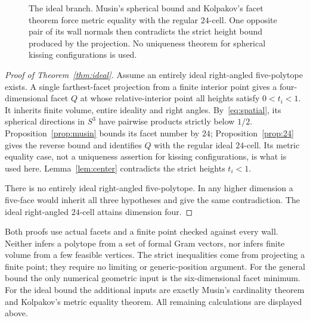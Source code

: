 \documentclass[11pt]{article}
\theoremstyle{remark}
\newcommand{\CELL}{\mathcal C}
\begin{document}
\begin{figure}[t]
\centering
{}
\caption{The ideal branch. Musin's spherical bound and Kolpakov's
facet theorem force metric equality with the regular $24$-cell.
One opposite pair of its wall normals then contradicts the strict
height bound produced by the projection. No uniqueness theorem for
spherical kissing configurations is used.}
\label{fig:idealbranch}
\end{figure}

\begin{proof}[Proof of Theorem~\ref{thm:ideal}]
Assume an entirely ideal right-angled five-polytope exists. A single
farthest-facet projection from a finite interior point gives a
four-dimensional facet $Q$ at whose relative-interior point all heights satisfy
$0<t_i<1$. It inherits finite volume, entire ideality and right angles.
By~\eqref{eq:spatial}, its spherical directions in $S^3$ have
pairwise products strictly below $1/2$. Proposition~\ref{prop:musin}
bounds its facet number by $24$; Proposition~\ref{prop:24} gives the
reverse bound and identifies $Q$ with the regular ideal $24$-cell.
Its metric equality case, not a uniqueness assertion for kissing
configurations, is what is used here. Lemma~\ref{lem:center}
contradicts the strict heights $t_i<1$.

There is no entirely ideal right-angled five-polytope. In any higher
dimension a five-face would inherit all three hypotheses and give
the same contradiction. The ideal right-angled $24$-cell attains
dimension four.
\end{proof}

Both proofs use actual facets and a finite point checked against
every wall. Neither infers a polytope from a set of formal Gram
vectors, nor infers finite volume from a few feasible vertices.
The strict inequalities come from projecting a finite point;
they require no limiting or generic-position argument. For the
general bound the only numerical geometric input is the
six-dimensional facet minimum. For the ideal bound the additional
inputs are exactly Musin's cardinality theorem and Kolpakov's metric
equality theorem. All remaining calculations are displayed above.
\end{document}
